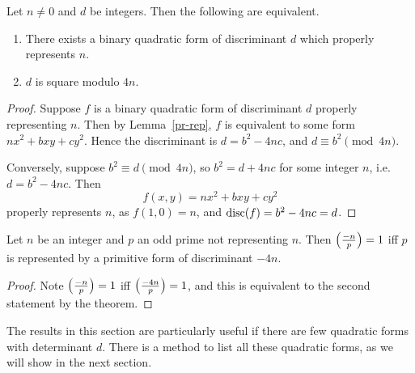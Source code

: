 \begin{thm}
Let $n\ne 0$ and $d$ be integers. Then the following are equivalent.
\begin{enumerate}
\item There exists a binary quadratic form of discriminant $d$ which properly represents $n$.
\item $d$ is square modulo $4n$.
\end{enumerate}
\end{thm}
\begin{proof}
Suppose $f$ is a binary quadratic form of discriminant $d$ properly representing $n$. Then by Lemma~\ref{pr-rep}, $f$ is equivalent to some form $nx^2+bxy+cy^2$. Hence the discriminant is $d=b^2-4nc$, and $d\equiv b^2\pmod{4n}$.

Conversely, suppose $b^2\equiv d\pmod{4n}$, so $b^2=d+4nc$ for some integer $n$, i.e. $d=b^2-4nc$. Then
\[
f(x,y)=nx^2+bxy+cy^2
\]
properly represents $n$, as $f(1,0)=n$, and $\operatorname{disc}(f)=b^2-4nc=d$.
\end{proof}
\begin{cor}
Let $n$ be an integer and $p$ an odd prime not representing $n$. Then $\left( {\frac{-n}{p}} \right)=1$ iff $p$ is represented by a primitive form of discriminant $-4n$.
\end{cor}
\begin{proof}
Note $\left( {\frac{-n}{p}} \right)=1$ iff $\left( {\frac{-4n}{p}} \right)=1$, and this is equivalent to the second statement by the theorem.
\end{proof}
The results in this section are particularly useful if there are few quadratic forms with determinant $d$. There is a method to list all these quadratic forms, as we will show in the next section.
